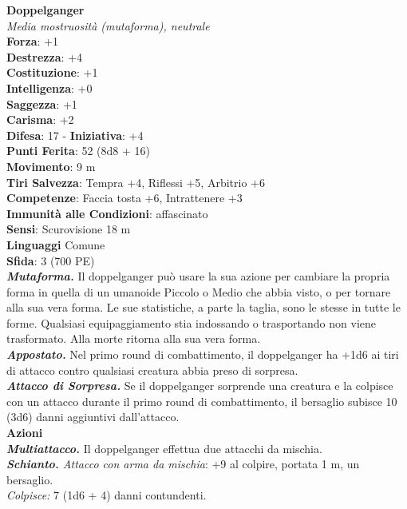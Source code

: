 \begin{multicols}{2}
\medskip\textbf{Doppelganger}\\
\emph{Media mostruosità (mutaforma), neutrale}\\
\textbf{Forza}: +1\\
\textbf{Destrezza}: +4\\
\textbf{Costituzione}: +1\\
\textbf{Intelligenza}: +0\\
\textbf{Saggezza}: +1\\
\textbf{Carisma}: +2\\
\textbf{Difesa}: 17 - \textbf{Iniziativa}: +4\\
\textbf{Punti Ferita}: 52 (8d8 + 16)\\
\textbf{Movimento}: 9 m\\
\textbf{Tiri Salvezza}: Tempra +4, Riflessi +5, Arbitrio +6\\
\textbf{Competenze}: Faccia tosta +6, Intrattenere +3\\
\textbf{Immunità alle Condizioni}: affascinato\\
\textbf{Sensi}: Scurovisione 18 m\\
\textbf{Linguaggi} Comune\\
\textbf{Sfida}: 3 (700 PE)\smallskip\\
\emph{\textbf{Mutaforma.}} Il doppelganger può usare la sua azione per cambiare la propria forma in quella di un umanoide Piccolo o Medio che abbia visto, o per tornare alla sua vera forma. Le sue statistiche, a parte la taglia, sono le stesse in tutte le forme. Qualsiasi equipaggiamento stia indossando o trasportando non viene trasformato.  Alla morte ritorna alla sua vera forma.\\
\emph{\textbf{Appostato.}} Nel primo round di combattimento, il doppelganger ha +1d6 ai tiri di attacco contro qualsiasi creatura abbia preso di sorpresa.\\
\emph{\textbf{Attacco di Sorpresa.}} Se il doppelganger sorprende una creatura e la colpisce con un attacco durante il primo round di combattimento, il bersaglio subisce 10 (3d6) danni aggiuntivi dall'attacco.\\
\smallskip\textbf{Azioni}\\
\emph{\textbf{Multiattacco.}} Il doppelganger effettua due attacchi da mischia.\\
\emph{\textbf{Schianto.} Attacco con arma da mischia}: +9 al colpire, portata 1 m, un bersaglio.\\
\emph{Colpisce:} 7 (1d6 + 4) danni contundenti.\\

\end{multicols}
